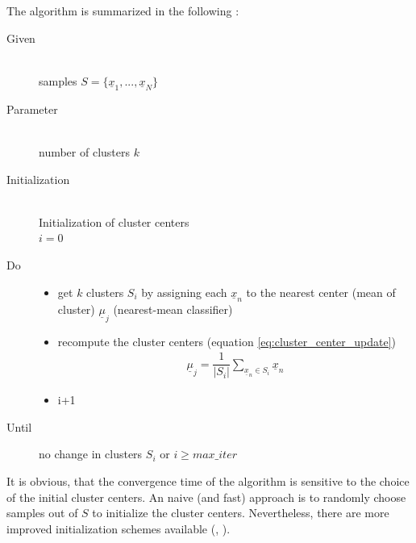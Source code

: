 \documentclass[12pt,DIV14,BCOR12mm,a4paper,footexclude,headinclude,halfparskip-,twoside,openright,openany,cleardoubleempty,idxtotoc,bibtotoc]{scrreprt} %
\numberwithin{equation}{chapter}
\begin{document}
The algorithm is summarized in the following \cite{LectureNotes_DPR}:
\begin{description}
	\item[Given]\hfill \\
		samples $S = \lbrace\underline{x}_{1},...,\underline{x}_{N}\rbrace$
	\item[Parameter]\hfill \\
		number of clusters $k$
	\item[Initialization]\hfill \\
		Initialization of cluster centers\\
		$i = 0$
	\item[Do]\hfill
		\begin{itemize}
			\item get $k$ clusters $S_{i}$ by assigning each $\underline{x}_{n}$ to the nearest center (mean of cluster) $\underline{\mu}_{j}$ (nearest-mean classifier)
			\item recompute the cluster centers (equation \ref{eq:cluster_center_update})
				\begin{align}
					\underline{\mu}_{j} = \dfrac{1}{|S_{i}|} \sum_{\underline{x}_{n} \in S_{i}}\underline{x}_{n}\label{eq:cluster_center_update}
				\end{align}
			\item i+1
		\end{itemize}
	\item[Until] no change in clusters $S_{i}$ or $i \geq max\_iter$
\end{description}
It is obvious, that the convergence time of the algorithm is sensitive to the choice of the initial cluster centers. An naive (and fast) approach is to randomly choose samples out of $S$ to initialize the cluster centers. Nevertheless, there are more improved initialization schemes available (\cite{Yi10ImprovedInitialization}, \cite{Arthuer07kmeans_plusplus}).
\end{document}
